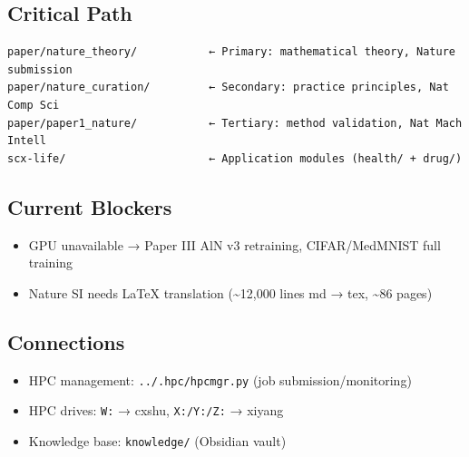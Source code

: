 \documentclass[
  12pt,
]{article}
\providecommand{\tightlist}{%
  \setlength{\itemsep}{0pt}\setlength{\parskip}{0pt}}
\begin{document}
\subsection{Critical Path}\label{critical-path}

\begin{verbatim}
paper/nature_theory/           ← Primary: mathematical theory, Nature submission
paper/nature_curation/         ← Secondary: practice principles, Nat Comp Sci
paper/paper1_nature/           ← Tertiary: method validation, Nat Mach Intell
scx-life/                      ← Application modules (health/ + drug/)
\end{verbatim}

\subsection{Current Blockers}\label{current-blockers}

\begin{itemize}
\tightlist
\item
  GPU unavailable → Paper III AlN v3 retraining, CIFAR/MedMNIST full training
\item
  Nature SI needs LaTeX translation (\textasciitilde12,000 lines md → tex,
  \textasciitilde86 pages)
\end{itemize}

\subsection{Connections}\label{connections}

\begin{itemize}
\tightlist
\item
  HPC management: \texttt{../.hpc/hpcmgr.py} (job submission/monitoring)
\item
  HPC drives: \texttt{W:} → cxshu, \texttt{X:/Y:/Z:} → xiyang
\item
  Knowledge base: \texttt{knowledge/} (Obsidian vault)
\end{itemize}
\end{document}

